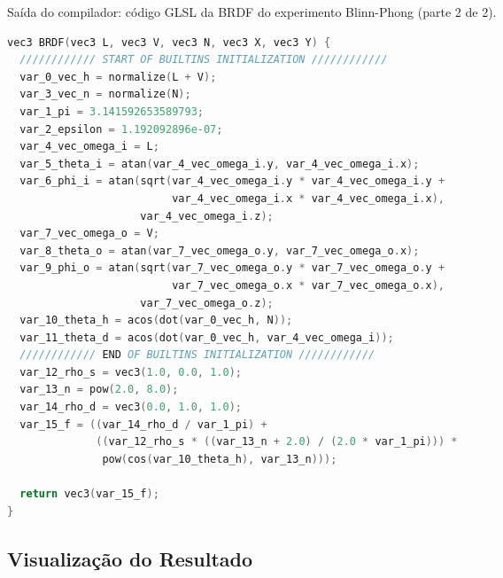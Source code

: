 \begin{codigo}[H]
    \caption{\small Saída do compilador: código GLSL da BRDF do experimento Blinn-Phong (parte 2 de 2).}
    \label{cod-blinn-phong-glsl-pt-2}
\begin{lstlisting}[language=C, inputencoding=utf8]
vec3 BRDF(vec3 L, vec3 V, vec3 N, vec3 X, vec3 Y) {
  //////////// START OF BUILTINS INITIALIZATION ////////////
  var_0_vec_h = normalize(L + V);
  var_3_vec_n = normalize(N);
  var_1_pi = 3.141592653589793;
  var_2_epsilon = 1.192092896e-07;
  var_4_vec_omega_i = L;
  var_5_theta_i = atan(var_4_vec_omega_i.y, var_4_vec_omega_i.x);
  var_6_phi_i = atan(sqrt(var_4_vec_omega_i.y * var_4_vec_omega_i.y +
                          var_4_vec_omega_i.x * var_4_vec_omega_i.x),
                     var_4_vec_omega_i.z);
  var_7_vec_omega_o = V;
  var_8_theta_o = atan(var_7_vec_omega_o.y, var_7_vec_omega_o.x);
  var_9_phi_o = atan(sqrt(var_7_vec_omega_o.y * var_7_vec_omega_o.y +
                          var_7_vec_omega_o.x * var_7_vec_omega_o.x),
                     var_7_vec_omega_o.z);
  var_10_theta_h = acos(dot(var_0_vec_h, N));
  var_11_theta_d = acos(dot(var_0_vec_h, var_4_vec_omega_i));
  //////////// END OF BUILTINS INITIALIZATION ////////////
  var_12_rho_s = vec3(1.0, 0.0, 1.0);
  var_13_n = pow(2.0, 8.0);
  var_14_rho_d = vec3(0.0, 1.0, 1.0);
  var_15_f = ((var_14_rho_d / var_1_pi) +
              ((var_12_rho_s * ((var_13_n + 2.0) / (2.0 * var_1_pi))) *
               pow(cos(var_10_theta_h), var_13_n)));

  return vec3(var_15_f);
}
\end{lstlisting}
\end{codigo}

\subsection{Visualização do Resultado}

